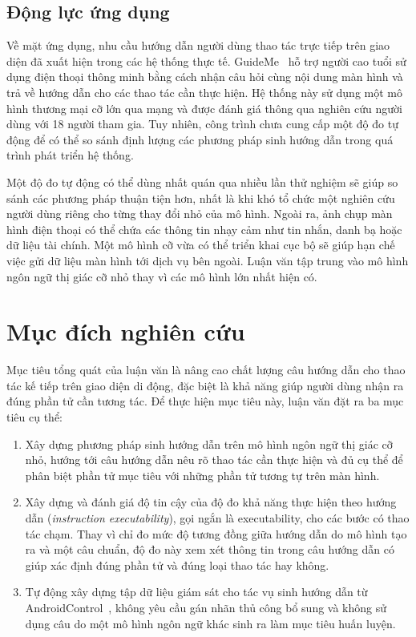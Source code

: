 \subsection{Động lực ứng dụng}\label{sec:1.2.2}

Về mặt ứng dụng, nhu cầu hướng dẫn người dùng thao tác trực tiếp trên giao diện đã xuất hiện trong các hệ thống thực tế. GuideMe~\cite{guideme} hỗ trợ người cao tuổi sử dụng điện thoại thông minh bằng cách nhận câu hỏi cùng nội dung màn hình và trả về hướng dẫn cho các thao tác cần thực hiện. Hệ thống này sử dụng một mô hình thương mại cỡ lớn qua mạng và được đánh giá thông qua nghiên cứu người dùng với 18 người tham gia. Tuy nhiên, công trình chưa cung cấp một độ đo tự động để có thể so sánh định lượng các phương pháp sinh hướng dẫn trong quá trình phát triển hệ thống.

Một độ đo tự động có thể dùng nhất quán qua nhiều lần thử nghiệm sẽ giúp so sánh các phương pháp thuận tiện hơn, nhất là khi khó tổ chức một nghiên cứu người dùng riêng cho từng thay đổi nhỏ của mô hình. Ngoài ra, ảnh chụp màn hình điện thoại có thể chứa các thông tin nhạy cảm như tin nhắn, danh bạ hoặc dữ liệu tài chính. Một mô hình cỡ vừa có thể triển khai cục bộ sẽ giúp hạn chế việc gửi dữ liệu màn hình tới dịch vụ bên ngoài. Luận văn tập trung vào mô hình ngôn ngữ thị giác cỡ nhỏ thay vì các mô hình lớn nhất hiện có.

\section{Mục đích nghiên cứu}\label{sec:1.3}

Mục tiêu tổng quát của luận văn là nâng cao chất lượng câu hướng dẫn cho thao tác kế tiếp trên giao diện di động, đặc biệt là khả năng giúp người dùng nhận ra đúng phần tử cần tương tác. Để thực hiện mục tiêu này, luận văn đặt ra ba mục tiêu cụ thể:

\begin{enumerate}
\item Xây dựng phương pháp sinh hướng dẫn trên mô hình ngôn ngữ thị giác cỡ nhỏ, hướng tới câu hướng dẫn nêu rõ thao tác cần thực hiện và đủ cụ thể để phân biệt phần tử mục tiêu với những phần tử tương tự trên màn hình.
\item Xây dựng và đánh giá độ tin cậy của độ đo khả năng thực hiện theo hướng dẫn (\emph{instruction executability}), gọi ngắn là executability, cho các bước có thao tác chạm. Thay vì chỉ đo mức độ tương đồng giữa hướng dẫn do mô hình tạo ra và một câu chuẩn, độ đo này xem xét thông tin trong câu hướng dẫn có giúp xác định đúng phần tử và đúng loại thao tác hay không.
\item Tự động xây dựng tập dữ liệu giám sát cho tác vụ sinh hướng dẫn từ AndroidControl~\cite{androidcontrol}, không yêu cầu gán nhãn thủ công bổ sung và không sử dụng câu do một mô hình ngôn ngữ khác sinh ra làm mục tiêu huấn luyện.
\end{enumerate}


